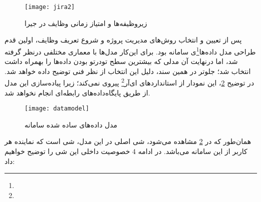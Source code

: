 \begin{figure}[H]
	\centering
	\texttt{[image: jira2]}
	\caption{زیروظیفه‌ها و امتیاز زمانی وظایف در جیرا}
	\label{fig:jira2}
\end{figure}

\newpage



پس از تعیین و انتخاب روش‌های مدیریت پروژه و شروع تعریف وظایف، اولین قدم طراحی مدل داده‌ها\footnote{}ی سامانه بود. برای این‌کار مدل‌ها با معماری مختلفی درنظر گرفته شد، اما درنهایت آن مدلی که بیشترین سطح تودرتو بودن داده‌ها را بهمراه داشت انتخاب شد؛ جلوتر در همین سند، دلیل این انتخاب از نظر فنی توضیح داده خواهد شد. در توضیح \cref{fig:datamodel}، این نمودار از استانداردهای ای‌آر\footnote{} پیروی نمی‌کند؛ زیرا پیاده‌سازی این مدل از طریق پایگاه‌داده‌های رابطه‌ای انجام نخواهد شد.

\begin{figure}[H]
	\centering
	\texttt{[image: datamodel]}
	\caption{مدل داده‌های ساده شده سامانه}
	\label{fig:datamodel}
\end{figure}

\newpage


همان‌طور که در \cref{fig:datamodel} مشاهده می‌شود، شی اصلی در این مدل، شی  است که نماینده هر کاربر از این سامانه می‌باشد. در ادامه 4 خصوصیت داخلی این شی را توضیح خواهیم داد:

